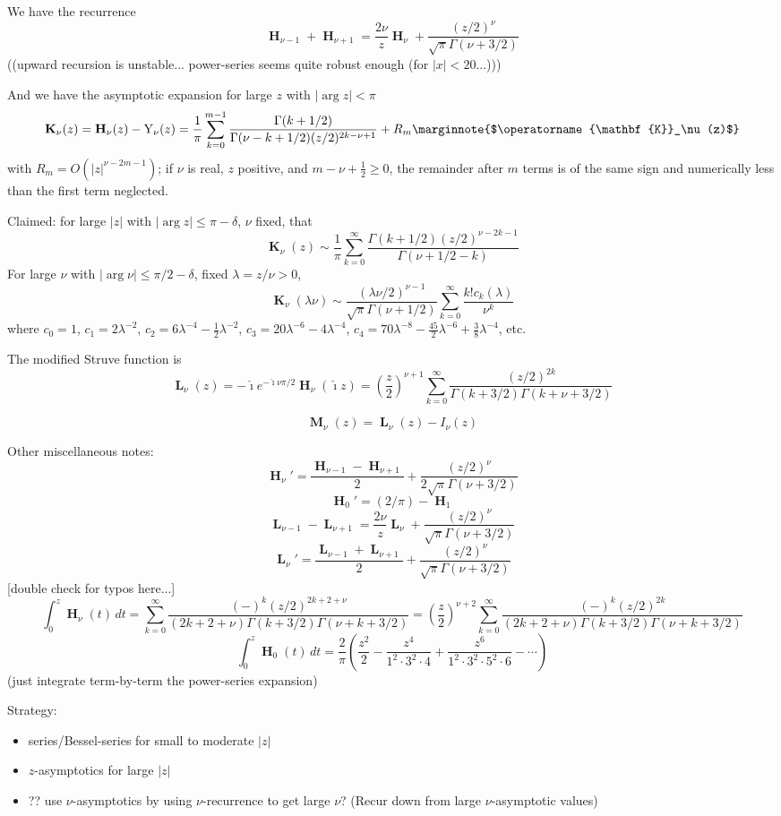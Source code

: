 \documentclass[10pt,dvipdfmx,letterpaper,twoside]{article}
\let\O=\operatorname
\newcommand{\Ob}[1]{\operatorname{\mathbf{#1}}}
\newcommand{\ii}{{\hat{\imath}}}
\let\DEF=\marginnote
\let\Gam=\Gamma
\let\lam=\lambda
\begin{document}
We have the recurrence
\[ \Ob{H}_{\nu-1} + \Ob{H}_{\nu+1} = \frac{2\nu}{z}\Ob{H}_\nu + \frac{(z/2)^\nu}{\sqrt{\pi} \Gam(\nu+3/2)} \]
((upward recursion is unstable... power-series seems quite robust enough (for $|x|<20$...)))

And we have the asymptotic expansion for large $z$ with $|\arg z|<\pi$
\[ \Ob{K}_\nu(z) = \Ob{H}_\nu(z) - \O{Y}_\nu(z) = \frac{1}{\pi}\sum_{k=0}^{m-1}\frac{\Gam(k+1/2)}{\Gam(\nu-k+1/2)(z/2)^{2k-\nu+1}} + R_m \DEF{$\Ob{K}_\nu(z)$} \]
with $R_m=O(|z|^{\nu-2m-1})$; if $\nu$ is real, $z$ positive, and $m-\nu+\tfrac12\geq0$, the remainder after $m$ terms is of the
same sign and numerically less than the first term neglected.

Claimed: for large $|z|$ with $|\arg z|\leq\pi-\delta$, $\nu$ fixed, that
\[ \Ob{K}_\nu(z) \sim \frac{1}{\pi} \sum_{k=0}^\infty \frac{\Gam(k+1/2)(z/2)^{\nu-2k-1}}{\Gam(\nu+1/2-k)} \]
For large $\nu$ with $|\arg\nu|\leq\pi/2-\delta$, fixed $\lam=z/\nu>0$,
\[ \Ob{K}_\nu(\lam\nu) \sim \frac{(\lam\nu/2)^{\nu-1}}{\sqrt{\pi}\Gam(\nu+1/2)} \sum_{k=0}^\infty \frac{k! c_k(\lam)}{\nu^k} \]
where $c_0=1$, $c_1=2\lam^{-2}$, $c_2=6\lam^{-4}-\frac12\lam^{-2}$, $c_3=20\lam^{-6}-4\lam^{-4}$,
$c_4=70\lam^{-8}-\frac{45}{2}\lam^{-6}+\frac{3}{8}\lam^{-4}$, etc.

The modified Struve function is
\[ \Ob{L}_\nu(z) = -\ii e^{-\ii\nu\pi/2} \Ob{H}_\nu(\ii z)
    = \left(\frac{z}{2}\right)^{\nu+1}\sum_{k=0}^\infty\frac{(z/2)^{2k}}{\Gam(k+3/2)\Gam(k+\nu+3/2)} \]

\[ \Ob{M}_\nu(z) = \Ob{L}_\nu(z) - I_\nu(z) \]

Other miscellaneous notes:
\[ \Ob{H}_\nu' = \frac{\Ob{H}_{\nu-1} - \Ob{H}_{\nu+1}}{2} + \frac{(z/2)^\nu}{2\sqrt{\pi} \Gamma(\nu+3/2)} \]
\[ \Ob{H}_0' = (2/\pi) - \Ob{H}_1 \]
\[ \Ob{L}_{\nu-1} - \Ob{L}_{\nu+1} = \frac{2\nu}{z}\Ob{L}_\nu + \frac{(z/2)^\nu}{\sqrt{\pi} \Gam(\nu+3/2)} \]
\[ \Ob{L}_\nu' = \frac{\Ob{L}_{\nu-1} + \Ob{L}_{\nu+1}}{2} + \frac{(z/2)^\nu}{\sqrt{\pi} \Gamma(\nu+3/2)} \]
[double check for typos here...]
\[ \int_0^z \Ob{H}_\nu(t)\,dt = \sum_{k=0}^\infty\frac{(-)^k(z/2)^{2k+2+\nu}}{(2k+2+\nu)\Gamma(k+3/2)\Gamma(\nu+k+3/2)}
    = \left(\frac{z}{2}\right)^{\nu+2}\sum_{k=0}^\infty\frac{(-)^k(z/2)^{2k}}{(2k+2+\nu)\Gamma(k+3/2)\Gamma(\nu+k+3/2)} \]
\[ \int_0^z \Ob{H}_0(t)\,dt = \frac{2}{\pi}\left(\frac{z^2}{2} - \frac{z^4}{1^2\cdot3^2\cdot4} + \frac{z^6}{1^2\cdot3^2\cdot5^2\cdot6} - \cdots\right) \]
(just integrate term-by-term the power-series expansion)

Strategy:
\begin{itemize}
  \item series/Bessel-series for small to moderate $|z|$
  \item $z$-asymptotics for large $|z|$
  \item ?? use $\nu$-asymptotics by using $\nu$-recurrence to get large $\nu$?  (Recur down from large $\nu$-asymptotic values)
\end{itemize}
\end{document}
